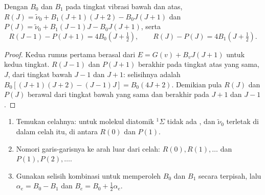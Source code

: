 \begin{theorem}\label{thm:b3:rovibrational-spectroscopy:combination-differences}
Dengan  $B_0$ dan $B_1$ pada tingkat vibrasi bawah dan atas,
$R(J) = \tilde\nu_0 + B_1(J+1)(J+2) - B_0J(J+1)$ dan $P(J) = \tilde\nu_0 +
B_1(J-1)J - B_0J(J+1)$, serta
\[
R(J - 1) - P(J + 1) = 4B_0(J + \tfrac12), \qquad R(J) - P(J) = 4B_1(J + \tfrac12).
\]
\end{theorem}

\begin{proof}
Kedua rumus pertama berasal dari $E = G(v) + B_vJ(J+1)$ untuk kedua tingkat.
$R(J - 1)$ dan $P(J + 1)$ berakhir pada tingkat atas yang sama, $J$, dari
tingkat bawah $J - 1$ dan $J + 1$: selisihnya adalah
$B_0[(J+1)(J+2) - (J-1)J] = B_0(4J + 2)$. Demikian pula $R(J)$ dan $P(J)$
berawal dari tingkat bawah yang sama dan berakhir pada $J + 1$ dan $J - 1$.
\end{proof}

\begin{method}\label{met:b3:rovibrational-spectroscopy:combination}
\begin{enumerate}
  \item Temukan celahnya: untuk molekul diatomik ${}^1\Sigma$ tidak ada , dan $\tilde\nu_0$ terletak di dalam celah itu, di antara $R(0)$ dan
        $P(1)$.
  \item Nomori garis-garisnya ke arah luar dari celah: $R(0), R(1), \dots$
        dan $P(1),
        P(2), \dots$.
  \item Gunakan selisih kombinasi untuk memperoleh $B_0$ dan $B_1$ secara
        terpisah, lalu $\alpha_e = B_0 - B_1$ dan $B_e = B_0 + \frac12\alpha_e$.
\end{enumerate}
\end{method}

